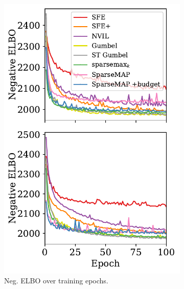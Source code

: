 \begin{figure}[ht]
    \centering
    \begin{subfigure}[b]{0.49\textwidth}
        \centering
        \includegraphics[width=\textwidth]{Figures/elbo-bit-vector.pdf}
        \caption{Neg. ELBO over training epochs.}
        \label{fig:elbo_bit_epochs}
    \end{subfigure}
    \begin{subfigure}[b]{0.49\textwidth}
        \centering

\end{subfigure}
\end{figure}
